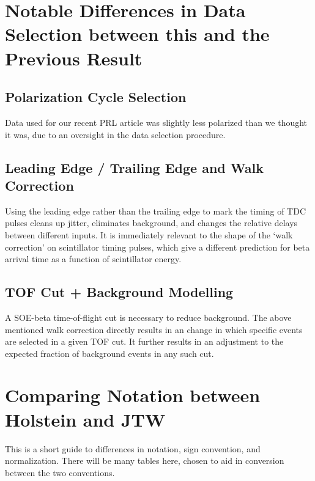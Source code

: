 \clearpage	
\chapter{Notable Differences in Data Selection between this and the Previous Result}
\section{Polarization Cycle Selection}
	Data used for our recent PRL article was slightly less polarized than we thought it was, due to an oversight in the data selection procedure.
	
\section{Leading Edge / Trailing Edge and Walk Correction}
	Using the leading edge rather than the trailing edge to mark the timing of TDC pulses cleans up jitter, eliminates background, and changes the relative delays between different inputs.  It is immediately relevant to the shape of the `walk correction' on scintillator timing pulses, which give a different prediction for beta arrival time as a function of scintillator energy.  %
	
\section{TOF Cut + Background Modelling}
	A SOE-beta time-of-flight cut is necessary to reduce background.  The above mentioned walk correction directly results in an change in which specific events are selected in a given TOF cut.  It further results in an adjustment to the expected fraction of background events in any such cut.
	
\chapter{Comparing Notation between Holstein and JTW}
	This is a short guide to differences in notation, sign convention, and normalization.
	There will be many tables here, chosen to aid in conversion between the two conventions.

